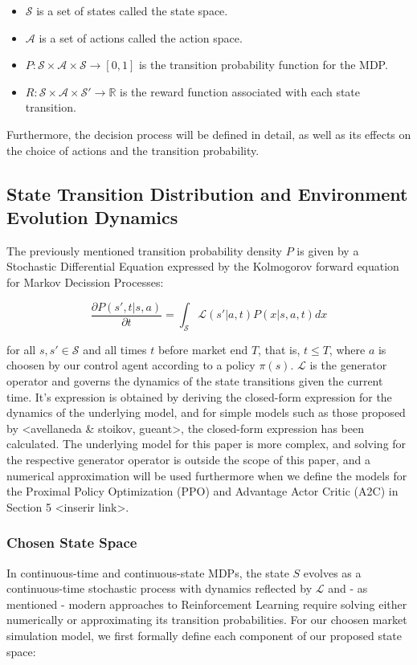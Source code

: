 \begin{itemize}
	\item $\mathcal{S}$ is a set of states called the state space.
	\item $\mathcal{A}$ is a set of actions called the action space.
	\item $P: \mathcal{S} \times \mathcal{A} \times \mathcal{S} \to [0, 1]$ is the transition probability function for the MDP.
	\item $R: \mathcal{S} \times \mathcal{A} \times \mathcal{S}' \rightarrow \mathbb{R}$ is the reward function associated with each state transition.
\end{itemize}

Furthermore, the decision process will be defined in detail, as well as its effects on the choice of actions and the transition probability.

\subsection{State Transition Distribution and Environment Evolution Dynamics}

The previously mentioned transition probability density $P$ is given by a Stochastic Differential Equation expressed by the Kolmogorov forward equation for Markov Decission Processes:

\begin{equation}
	\frac{\partial P(s', t | s, a)}{\partial t}  = \int_{\mathcal{S}} \mathcal{L}(s' | a, t) P(x| s, a, t) dx
\end{equation}

for all $s, s' \in \mathcal{S}$ and all times $t$ before market end $T$, that is, $t \le T$, where $a$ is choosen by our control agent according to a policy $\pi (s)$. $\mathcal{L}$ is the generator operator and governs the dynamics of the state transitions given the current time. It's expression is obtained by deriving the closed-form expression for the dynamics of the underlying model, and for simple models such as those proposed by <avellaneda & stoikov, gueant>, the closed-form expression has been calculated. The underlying model for this paper is more complex, and solving for the respective generator operator is outside the scope of this paper, and a numerical approximation will be used furthermore when we define the models for the Proximal Policy Optimization (PPO) and Advantage Actor Critic (A2C) in Section 5 <inserir link>.

\subsubsection{Chosen State Space}
In continuous-time and continuous-state MDPs, the state $S$ evolves as a continuous-time stochastic process with dynamics reflected by $\mathcal{L}$ and - as mentioned - modern approaches to Reinforcement Learning require solving either numerically or approximating its transition probabilities. For our choosen market simulation model, we first formally define each component of our proposed state space:

